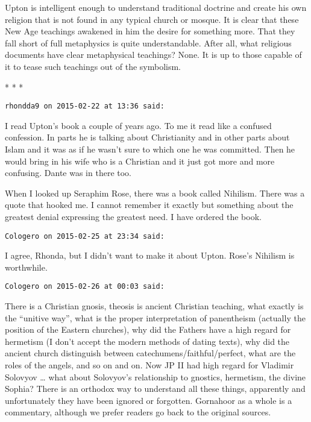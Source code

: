 Upton is intelligent enough to understand traditional doctrine and create his own religion that is not found in any typical church or mosque. It is clear that these New Age teachings awakened in him the desire for something more. That they fall short of full metaphysics is quite understandable. After all, what religious documents have clear metaphysical teachings? None. It is up to those capable of it to tease such teachings out of the symbolism.




\begin{center}* * *\end{center}

\begin{footnotesize}\begin{sffamily}



\texttt{rhondda9 on 2015-02-22 at 13:36 said: }

I read Upton's book a couple of years ago. To me it read like a confused confession. In parts he is talking about Christianity and in other parts about Islam and it was as if he wasn't sure to which one he was committed. Then he would bring in his wife who is a Christian and it just got more and more confusing. Dante was in there too.

When I looked up Seraphim Rose, there was a book called Nihilism. There was a quote that hooked me. I cannot remember it exactly but something about the greatest denial expressing the greatest need. I have ordered the book.


\hfill

\texttt{Cologero on 2015-02-25 at 23:34 said: }

I agree, Rhonda, but I didn't want to make it about Upton. Rose's Nihilism is worthwhile.


\hfill

\texttt{Cologero on 2015-02-26 at 00:03 said: }

There is a Christian gnosis, theosis is ancient Christian teaching, what exactly is the “unitive way”, what is the proper interpretation of panentheism (actually the position of the Eastern churches), why did the Fathers have a high regard for hermetism (I don't accept the modern methods of dating texts), why did the ancient church distinguish between catechumens/faithful/perfect, what are the roles of the angels, and so on and on. Now JP II had high regard for Vladimir Solovyov … what about Solovyov's relationship to gnostics, hermetism, the divine Sophia? There is an orthodox way to understand all these things, apparently and unfortunately they have been ignored or forgotten. Gornahoor as a whole is a commentary, although we prefer readers go back to the original sources. 

\hfill

\end{sffamily}\end{footnotesize}
